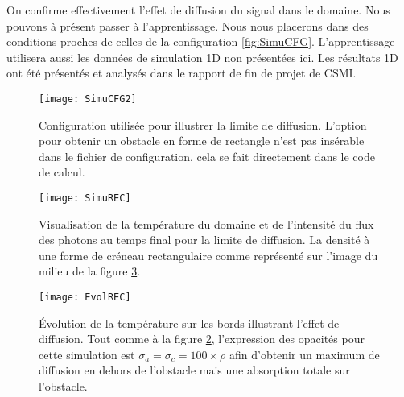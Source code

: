 On confirme effectivement l'effet de diffusion du signal dans le domaine. Nous pouvons à présent passer à l'apprentissage. Nous nous placerons dans des conditions proches de celles de la configuration \ref{fig:SimuCFG}. L'apprentissage utilisera aussi les données de simulation 1D non présentées ici. Les résultats 1D ont été présentés et analysés dans le rapport de fin de projet de CSMI. 

\begin{figure}[!h]
\centering
\texttt{[image: SimuCFG2]} 
\decoRule
\caption[SimuCFG2]{Configuration utilisée pour illustrer la limite de diffusion. L'option pour obtenir un obstacle en forme de rectangle n'est pas insérable dans le fichier de configuration, cela se fait directement dans le code de calcul.}
\label{fig:SimuCFG2}
\end{figure}


\begin{figure}[!h]
\centering
\texttt{[image: SimuREC]} 
\decoRule
\caption[SimuREC]{Visualisation de la température du domaine et de l'intensité du flux des photons au temps final pour la limite de diffusion. La densité à une forme de créneau rectangulaire comme représenté sur l'image du milieu de la figure \ref{fig:EvolREC}.}
\label{fig:SimuREC}
\end{figure}


\begin{figure}[!h]
\centering
\texttt{[image: EvolREC]} 
\decoRule
\caption[EvolREC]{Évolution de la température sur les bords illustrant l'effet de diffusion. Tout comme à la figure \ref{fig:SimuREC}, l'expression des opacités pour cette simulation est $\sigma_a = \sigma_c = 100 \times \rho$ afin d'obtenir un maximum de diffusion en dehors de l'obstacle mais une absorption totale sur l'obstacle.}
\label{fig:EvolREC}
\end{figure}

